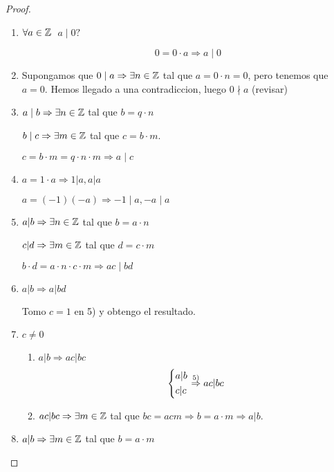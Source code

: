 \begin{proof}
	~\begin{enumerate}
		\item \(\forall  a \in \mathbb{Z} \) \(\; a \mid 0 ?\)
		      
		      \[
			      0 = 0 \cdot a \Rightarrow a \mid 0
		      \]
		\item Supongamos que \(0 \mid a \Rightarrow \exists n \in \mathbb{Z}\) tal que \(a = 0 \cdot n = 0 \), pero tenemos que \(a =  0 \). Hemos llegado a una contradiccion, luego \(0 \nmid a \) (revisar)
		\item \(a \mid b \Rightarrow \exists n \in \mathbb{Z} \) tal que \(b = q \cdot n \)
		      
		      \(b \mid c \Rightarrow \exists m \in \mathbb{Z} \) tal que \(c = b \cdot m \).
		      
		      \(c = b \cdot m = q \cdot n \cdot m \Rightarrow a \mid c \)
		      
		\item \(a = 1 \cdot a \Rightarrow 1| a, a | a\)
		      
		      \(a = (-1)(-a) \Rightarrow -1 \mid a, -a \mid a \)
		      
		\item \(a|b \Rightarrow \exists n \in \mathbb{Z} \) tal que \(b = a \cdot n \)
		      
		      \(c|d \Rightarrow \exists m \in \mathbb{Z} \) tal que \(d = c \cdot m \)
		      
		      \(b \cdot d = a \cdot n \cdot c \cdot m \Rightarrow ac \mid bd \)
		\item \(a|b \Rightarrow a|bd \)
		      
		      Tomo \(c= 1 \) en 5) y obtengo el resultado.
		\item \(c \neq 0\)
		      
		      \begin{enumerate}
			      \item \(a|b \Rightarrow ac | bc \)
			            \[
				            \begin{dcases}
					            a|b \\
					            c|c
				            \end{dcases} \overset{5)}{\Rightarrow} ac|bc
			            \]
			      \item \(ac|bc \Rightarrow \exists m \in \mathbb{Z} \) tal que \(bc = acm \Rightarrow b = a \cdot m \Rightarrow a | b \).
		      \end{enumerate}
		\item \(a | b \Rightarrow \exists m \in \mathbb{Z} \) tal que \(b = a \cdot m \)
		      

\end{enumerate}
\end{proof}
